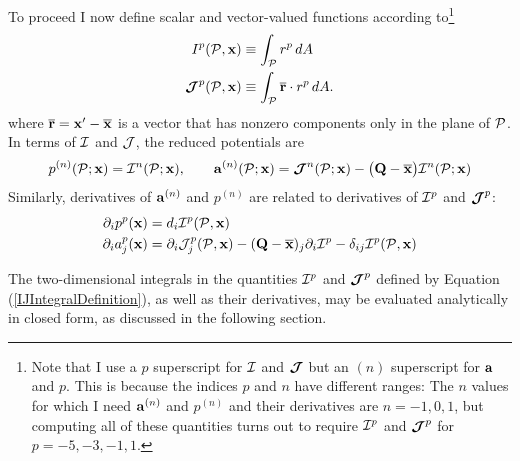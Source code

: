 \documentclass[letterpaper]{article}
\begin{document}
To proceed I now define scalar and vector-valued functions according 
to\footnote{Note that I use a $p$ superscript for $\mathcal{I}$ and $\boldsymbol{\mathcal{J}}$
but an $(n)$ superscript for $\mathbf{a}$ and $p$. This is because the 
indices $p$ and $n$ have different ranges: The $n$ values for which I 
need $\mathbf{a}^{(n)}$ and $p^{(n)}$ and their derivatives are 
$n={-1,0,1}$, but computing all of these quantities turns out to 
require $\mathcal{I}^p$ and $\boldsymbol{\mathcal{J}}^p$ for $p={-5,-3,-1,1}.$}
\begin{subequations}
\begin{align}
 I^p(\mathcal{P}, \mathbf{x}) &\equiv 
 \int_{\mathcal{P}} r^p \, dA
\\
\boldsymbol{\mathcal{J}}^p(\mathcal{P}, \mathbf{x})
 &\equiv \int_{\mathcal{P}} \overline{\mathbf{r}} \cdot  r^p \, dA.
\label{IJIntegralDefinition}
\end{align}
\end{subequations}
where $\overline{\mathbf{r}}=\mathbf{x}^\prime-\overline{\mathbf{x}}$ 
is a vector that has nonzero components only in the plane of $\mathcal{P}$.
In terms of $\mathcal{I}$ and $\mathcal{J}$, the reduced potentials are
$$ p^{(n)}(\mathcal{P}; \mathbf{x}) = \mathcal{I}^n(\mathcal{P}; \mathbf{x}),
   \qquad
   \mathbf{a}^{(n)}(\mathcal{P}; \mathbf{x}) =
   \boldsymbol{\mathcal{J}}^n(\mathcal{P}; \mathbf{x})
      - \big(\mathbf{Q}-\overline{\mathbf{x}}\big) \mathcal{I}^n(\mathcal{P}; \mathbf{x})
$$
Similarly, derivatives of $\mathbf{a}^{(n)}$ and $p^{(n)}$ are related to 
derivatives of $\mathcal{I}^p$ and $\boldsymbol{\mathcal{J}}^p$:
\begin{align*}
 \partial_i p^p (\mathbf{x}) &= d_i \mathcal{I}^p(\mathcal{P}, \mathbf{x}) 
\\
 \partial_i a^p_j (\mathbf{x})
&= \partial_i \mathcal{J}_j^p(\mathcal{P}, \mathbf{x})
  -(\mathbf{Q} - \overline{\mathbf{x}})_j \partial_i \mathcal{I}^p
  -\delta_{ij} \mathcal{I}^p(\mathcal{P}, \mathbf{x})
\end{align*}

The two-dimensional integrals in the quantities $\mathcal{I}^p$
and $\boldsymbol{\mathcal{J}}^p$ defined by Equation (\ref{IJIntegralDefinition}),
as well as their derivatives, may be evaluated analytically in 
closed form, as discussed in the following section.
\end{document}
